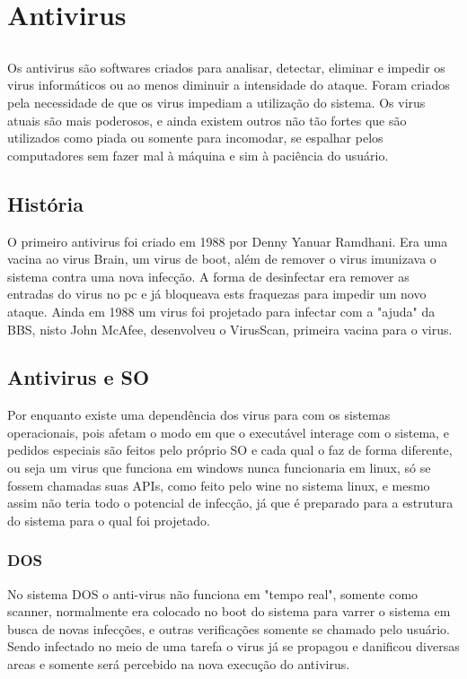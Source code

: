 \chapter{Antivirus}

\section{}
Os antivirus são softwares criados para analisar, detectar, eliminar e impedir os virus informáticos ou ao menos diminuir a intensidade do ataque. Foram criados pela necessidade de que os virus impediam a utilização do sistema. Os virus atuais são mais poderosos, e ainda existem outros não tão fortes que são utilizados como piada ou somente para incomodar, se espalhar pelos computadores sem fazer mal à máquina e sim à paciência do usuário.

\section{História}
O primeiro antivirus foi criado em 1988 por Denny Yanuar Ramdhani. Era uma vacina ao virus Brain, um virus de boot, além de remover o virus imunizava o sistema contra uma nova infecção. A forma de desinfectar era remover as entradas do virus no pc e já bloqueava ests fraquezas para impedir um novo ataque. Ainda em 1988 um virus foi projetado para infectar com a "ajuda" da BBS, nisto John McAfee, desenvolveu o VirusScan, primeira vacina para o virus.
\section{Antivirus e SO}
Por enquanto existe uma dependência dos virus para com os sistemas operacionais, pois afetam o modo em que o executável interage com o sistema, e pedidos especiais são feitos pelo próprio SO e cada qual o faz de forma diferente, ou seja um virus que funciona em windows nunca funcionaria em linux, só se fossem chamadas suas APIs, como feito pelo wine no sistema linux, e mesmo assim não teria todo o potencial de infecção, já que é preparado para a estrutura do sistema para o qual foi projetado.

\subsection{DOS}
No sistema DOS o anti-virus não funciona em "tempo real", somente como scanner, normalmente era colocado no boot do sistema para varrer o sistema em busca de novas infecções, e outras verificações somente se chamado pelo usuário. Sendo infectado no meio de uma tarefa o virus já se propagou e danificou diversas areas e somente será percebido na nova execução do antivirus.

